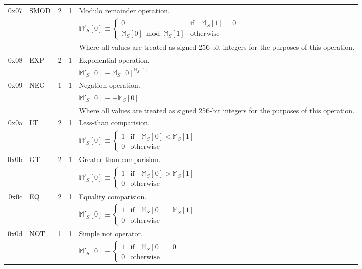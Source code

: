 \documentclass[9pt,oneside]{amsart}
\begin{document}
\begin{tabular*}{\columnwidth}[h]{rlrrl}
\midrule
0x07 & {\small SMOD} & 2 & 1 & Modulo remainder operation. \\
&&&& $\mathbb{M}'_S[0] \equiv \begin{cases}0 & \text{if} \quad \mathbb{M}_S[1] = 0\\ \mathbb{M}_S[0] \bmod \mathbb{M}_S[1] & \text{otherwise}\end{cases}$  \\
&&&& Where all values are treated as signed 256-bit integers for the purposes of this operation. \\
\midrule
0x08 & {\small EXP} & 2 & 1 & Exponential operation. \\
&&&& $\mathbb{M}'_S[0] \equiv \mathbb{M}_S[0] ^ {\mathbb{M}_S[1] }$ \\
\midrule
0x09 & {\small NEG} & 1 & 1 & Negation operation. \\
&&&& $\mathbb{M}'_S[0] \equiv -\mathbb{M}_S[0]$ \\
&&&& Where all values are treated as signed 256-bit integers for the purposes of this operation. \\
\midrule
0x0a & {\small LT} & 2 & 1 & Less-than comparision. \\
&&&& $\mathbb{M}'_S[0] \equiv \begin{cases} 1 & \text{if} \quad \mathbb{M}_S[0] < \mathbb{M}_S[1] \\ 0 & \text{otherwise} \end{cases}$ \\
\midrule
0x0b & {\small GT} & 2 & 1 & Greater-than comparision. \\
&&&& $\mathbb{M}'_S[0] \equiv \begin{cases} 1 & \text{if} \quad \mathbb{M}_S[0] > \mathbb{M}_S[1] \\ 0 & \text{otherwise} \end{cases}$ \\
\midrule
0x0c & {\small EQ} & 2 & 1 & Equality comparision. \\
&&&& $\mathbb{M}'_S[0] \equiv \begin{cases} 1 & \text{if} \quad \mathbb{M}_S[0] = \mathbb{M}_S[1] \\ 0 & \text{otherwise} \end{cases}$ \\
\midrule
0x0d & {\small NOT} & 1 & 1 & Simple not operator. \\
&&&& $\mathbb{M}'_S[0] \equiv \begin{cases} 1 & \text{if} \quad \mathbb{M}_S[0] = 0 \\ 0 & \text{otherwise} \end{cases}$ \\
\end{tabular*}
\end{document}
